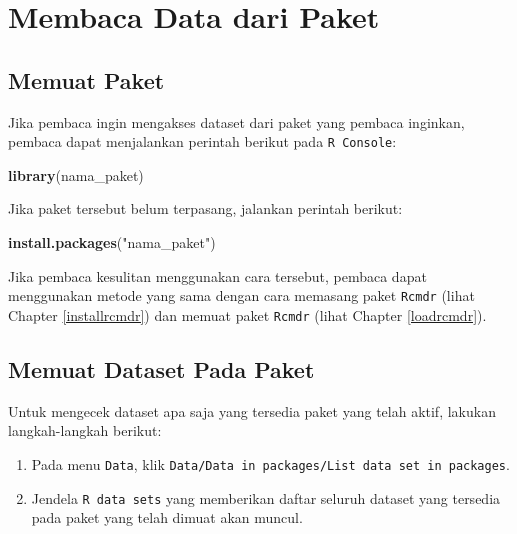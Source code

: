 \documentclass[12pt,]{krantz}
\newenvironment{Shaded}{\begin{snugshade}}{\end{snugshade}}
\newcommand{\KeywordTok}[1]{\textcolor[rgb]{0.13,0.29,0.53}{\textbf{#1}}}
\newcommand{\NormalTok}[1]{#1}
\newcommand{\StringTok}[1]{\textcolor[rgb]{0.31,0.60,0.02}{#1}}
\providecommand{\tightlist}{%
  \setlength{\itemsep}{0pt}\setlength{\parskip}{0pt}}
\begin{document}
\hypertarget{membaca-data-dari-paket}{%
\section{Membaca Data dari Paket}\label{membaca-data-dari-paket}}

\hypertarget{memuat-paket}{%
\subsection{Memuat Paket}\label{memuat-paket}}

Jika pembaca ingin mengakses dataset dari paket yang pembaca inginkan, pembaca dapat menjalankan perintah berikut pada \texttt{R\ Console}:

\begin{Shaded}
\begin{Highlighting}[]
\KeywordTok{library}\NormalTok{(nama_paket)}
\end{Highlighting}
\end{Shaded}

Jika paket tersebut belum terpasang, jalankan perintah berikut:

\begin{Shaded}
\begin{Highlighting}[]
\KeywordTok{install.packages}\NormalTok{(}\StringTok{"nama_paket"}\NormalTok{)}
\end{Highlighting}
\end{Shaded}

Jika pembaca kesulitan menggunakan cara tersebut, pembaca dapat menggunakan metode yang sama dengan cara memasang paket \texttt{Rcmdr} (lihat Chapter \ref{installrcmdr}) dan memuat paket \texttt{Rcmdr} (lihat Chapter \ref{loadrcmdr}).

\hypertarget{memuat-dataset-pada-paket}{%
\subsection{Memuat Dataset Pada Paket}\label{memuat-dataset-pada-paket}}

Untuk mengecek dataset apa saja yang tersedia paket yang telah aktif, lakukan langkah-langkah berikut:

\begin{enumerate}
\def\labelenumi{\arabic{enumi}.}
\tightlist
\item
  Pada menu \texttt{Data}, klik \texttt{Data/Data\ in\ packages/List\ data\ set\ in\ packages}.
\item
  Jendela \texttt{R\ data\ sets} yang memberikan daftar seluruh dataset yang tersedia pada paket yang telah dimuat akan muncul.
\end{enumerate}
\end{document}
